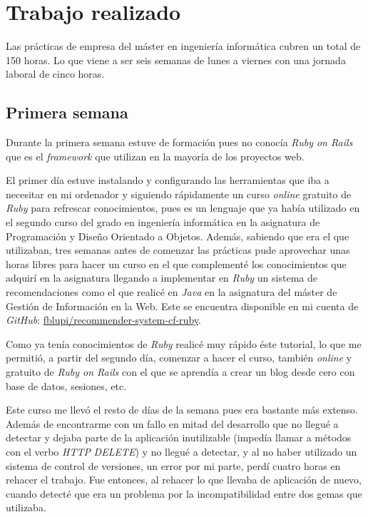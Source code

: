 \chapter{Trabajo realizado}

Las prácticas de empresa del máster en ingeniería informática cubren un total de 150 horas. Lo que viene a ser seis semanas de lunes a viernes con una jornada laboral de cinco horas.

\section{Primera semana}

Durante la primera semana estuve de formación pues no conocía \textit{Ruby on Rails} que es el \textit{framework} que utilizan en la mayoría de los proyectos web.

El primer día estuve instalando y configurando las herramientas que iba a necesitar en mi ordenador y siguiendo rápidamente un curso \textit{online} gratuito de \textit{Ruby} \cite{codigofacilito-ruby} para refrescar conocimientos, pues es un lenguaje que ya había utilizado en el segundo curso del grado en ingeniería informática en la asignatura de Programación y Diseño Orientado a Objetos. Además, sabiendo que era el que utilizaban, tres semanas antes de comenzar las prácticas pude aprovechar unas horas libres para hacer un curso en el que complementé los conocimientos que adquirí en la asignatura llegando a implementar en \textit{Ruby} un sistema de recomendaciones como el que realicé en \textit{Java} en la asignatura del máster de Gestión de Información en la Web. Este se encuentra disponible en mi cuenta de \textit{GitHub}: \href{https://github.com/fblupi/recommender-system-cf-ruby}{fblupi/recommender-system-cf-ruby}.

Como ya tenía conocimientos de \textit{Ruby} realicé muy rápido éste tutorial, lo que me permitió, a partir del segundo día, comenzar a hacer el curso, también \textit{online} y gratuito de \textit{Ruby on Rails} \cite{codigofacilito-rails} con el que se aprendía a crear un blog desde cero con base de datos, sesiones, etc.

Este curso me llevó el resto de días de la semana pues era bastante más extenso. Además de encontrarme con un fallo en mitad del desarrollo que no llegué a detectar y dejaba parte de la aplicación inutilizable (impedía llamar a métodos con el verbo \textit{HTTP} \textit{DELETE}) y no llegué a detectar, y al no haber utilizado un sistema de control de versiones, un error por mi parte, perdí cuatro horas en rehacer el trabajo. Fue entonces, al rehacer lo que llevaba de aplicación de nuevo, cuando detecté que era un problema por la incompatibilidad entre dos gemas que utilizaba.

